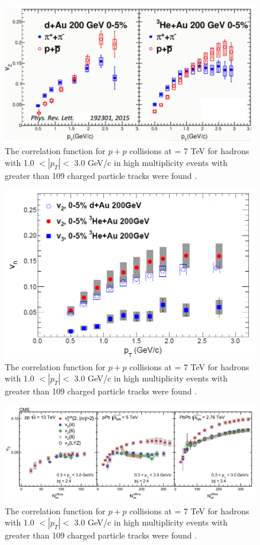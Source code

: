 \begin{figure}[h!]
\begin{center}
\includegraphics[width=0.65\linewidth]{figs/dhau_mass_ordering_phenix.PNG}
\caption{ The correlation function for $p+p$ collisions at \sqsn = 7 TeV for hadrons with 1.0 $<|p_T|<$ 3.0 GeV/c in high multiplicity events with greater than 109 charged particle tracks were found \cite{Khachatryan2010}.}
\label{fig:pp_ridge_plot}
\end{center}
\end{figure}

\begin{figure}[h!]
\begin{center}
\includegraphics[width=0.75\linewidth]{figs/hedau_v2_v3.PNG}
\caption{ The correlation function for $p+p$ collisions at \sqsn = 7 TeV for hadrons with 1.0 $<|p_T|<$ 3.0 GeV/c in high multiplicity events with greater than 109 charged particle tracks were found \cite{Khachatryan2010}.}
\label{fig:pp_ridge_plot}
\end{center}
\end{figure}

\begin{figure}[h!]
\begin{center}
\includegraphics[width=0.65\linewidth]{figs/pp_pPb_PbPb_cumulants.PNG}
\caption{ The correlation function for $p+p$ collisions at \sqsn = 7 TeV for hadrons with 1.0 $<|p_T|<$ 3.0 GeV/c in high multiplicity events with greater than 109 charged particle tracks were found \cite{Khachatryan2010}.}
\label{fig:pp_ridge_plot}
\end{center}
\end{figure}

